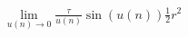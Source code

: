 \documentclass[preview]{standalone}
\begin{document}
\begin{align*}
\lim_{u(n) \to 0} \frac {\tau} {u(n)} \sin \left( u(n) \right) \frac {1} {2} r^2
\end{align*}
\end{document}
